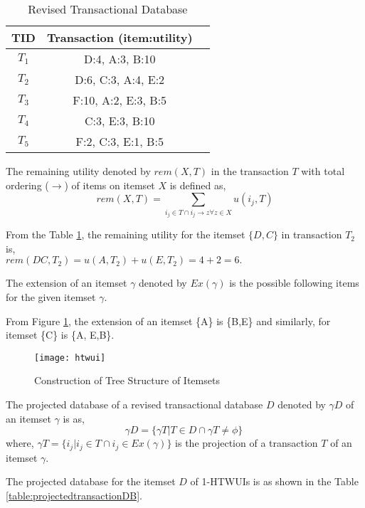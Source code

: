 \documentclass[11pt,openright]{report}
\begin{document}
\begin{table}
	\renewcommand{\arraystretch}{1.3}
	\caption{Revised Transactional Database}
	\label{table:revisedDatabase}
	\centering
	\begin{tabular}{|c||c||c|}
		\hline
		\bfseries TID & \bfseries Transaction (item:utility)\\
		\hline\hline
		$T_1$ & D:4, A:3, B:10\\ \hline
		$T_2$ & D:6, C:3, A:4, E:2\\ \hline
		$T_3$ & F:10, A:2, E:3, B:5\\ \hline
		$T_4$ & C:3, E:3, B:10\\ \hline
		$T_5$ & F:2, C:3, E:1, B:5\\ \hline
	\end{tabular}
\end{table}

\begin{definition}
	The remaining utility denoted by $rem(X,T)$ in the transaction $T$ with total ordering ($\rightarrow$) of items on itemset $X$ is defined as,
	\begin{equation}
	rem(X,T) = \sum_{i_j \in T \cap i_j \rightarrow z \forall z \in X} u(i_j, T)
	\label{eq:remaining_utility}
	\end{equation}
\end{definition}
From the Table \ref{table:revisedDatabase}, the remaining utility for the itemset $\{D,C\}$ in transaction $T_2$ is,\\
\indent $rem(DC,T_2) = u(A,T_2) + u(E,T_2) = 4 + 2 = 6.$

\begin{definition}
The extension of an itemset $\gamma$ denoted by $Ex(\gamma)$ is the possible following items for the given itemset $\gamma$.
\end{definition}
From Figure \ref{fig:htwui_tree_structure}, the extension of an itemset \{A\} is \{B,E\} and similarly, for itemset \{C\} is \{A, E,B\}.

\begin{figure}
	\centering
	\texttt{[image: htwui]}
	\caption{Construction of Tree Structure of Itemsets}
	\label{fig:htwui_tree_structure}
\end{figure}

\bigskip
\begin{definition}
The projected database of a revised transactional database $D$ denoted by ${\gamma}D$ of an itemset $\gamma$ is as, 	
	\begin{equation}
	{\gamma}D = \{ {\gamma}T|T \in D \cap {\gamma}T \ne \phi\}\
	\end{equation}	
	where, ${\gamma}T = \{i_j|i_j \in T \cap i_j \in Ex(\gamma)\}$ is the projection of a transaction $T$ of an itemset $\gamma$.
\end{definition}
The projected database for the itemset $D$ of 1-HTWUIs is as shown in the Table \ref{table:projectedtransactionDB}.
\end{document}
